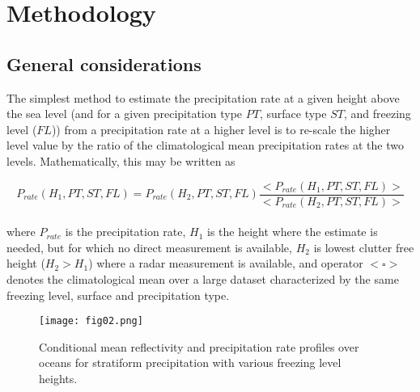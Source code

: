 \documentclass{ametsocV6.1} %
\begin{document}
    
\section{Methodology}
\subsection{General considerations{\label{genConsid}}}
    
The simplest method to estimate the precipitation rate at a given height 
above the sea level (and for a given precipitation type $PT$, surface type $ST$, and freezing level ($FL$)) from a precipitation rate at a higher level is to re-scale the higher level value by the ratio of the climatological mean precipitation rates at the two levels. Mathematically, this may be written as

\begin{equation}
    P_{rate}(H_1,PT,ST,FL)=P_{rate}(H_2,PT,ST,FL) \frac {<P_{rate}(H_1,PT,ST,FL)>} {<P_{rate}(H_2,PT,ST,FL)>} 
    \label{eq:bCorr}
\end{equation}\\

\noindent where $P_{rate}$ is the precipitation rate, $H_1$ is the height where the estimate is needed, but for which no direct measurement is available, $H_2$ is lowest clutter free height ($H_2>H_1$) where a radar measurement is available, and operator $<\square>$ denotes the climatological mean over a large dataset characterized by the same freezing level, surface and precipitation type.

\begin{figure}[h]
    \centering
    \texttt{[image: fig02.png]}
    \caption{Conditional mean reflectivity and precipitation rate profiles over oceans for stratiform precipitation with various freezing level heights.}
    \label{fig:figMeanProfOceans}
\end{figure}
\end{document}
